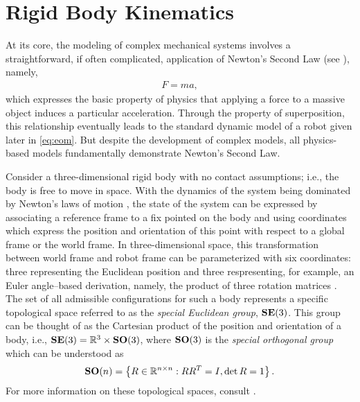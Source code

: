 \section{Rigid Body Kinematics}

At its core, the modeling of complex mechanical systems involves a
straightforward, if often complicated, application of Newton's Second Law (see
\cite{Feynman1964}), namely,
\begin{align*}
  F = m a,
\end{align*}
which expresses the basic property of physics that applying a force to a massive
object induces a particular acceleration.
%
Through the property of superposition, this relationship eventually leads to the
standard dynamic model of a robot given later in \eqref{eq:eom}.
%
But despite the development of complex models, all physics-based models
fundamentally demonstrate Newton's Second Law.

Consider a three-dimensional rigid body with no contact assumptions; i.e., the
body is free to move in space.
%
With the dynamics of the system being dominated by Newton's laws of motion
\cite{Feynman1964}, the state of the system can be expressed by associating a
reference frame to a fix pointed on the body and using coordinates which express
the position and orientation of this point with respect to a global frame or the
world frame.
%
In three-dimensional space, this transformation between world frame and robot
frame can be parameterized with six coordinates: three representing the
Euclidean position and three respresenting, for example, an Euler angle--based
derivation, namely, the product of three rotation matrices
\cite[Ch. 7]{Baruh1998}.
%
The set of all admissible configurations for such a body represents a specific
topological space referred to as the {\em special Euclidean group}, $\mathbf{SE}(3)$.
%
This group can be thought of as the Cartesian product of the position and
orientation of a body, i.e., $\mathbf{SE}(3) = \mathbb{R}^3 \times \mathbf{SO}(3)$, where $\mathbf{SO}(3)$ is
the {\em special orthogonal group} which can be understood as
\begin{align*}
  \mathbf{SO}(n) = \left\{ R \in \mathbb{R}^{n \times n} : R R^T = I, \det R = 1 \right\}.
\end{align*}
For more information on these topological spaces, consult
\cite[Ch. 2]{Murray1994}.


